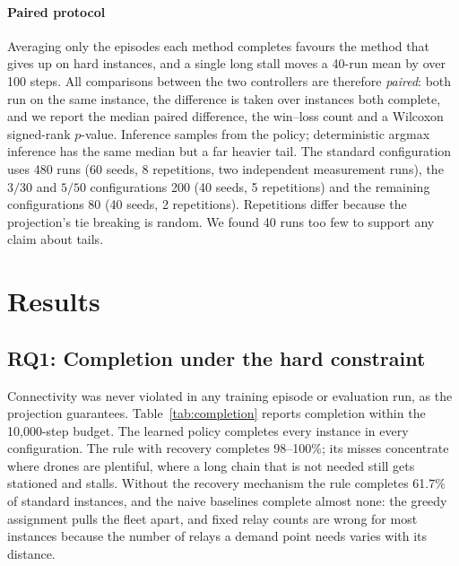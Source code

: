\documentclass[final,5p,times,twocolumn]{elsarticle}
\begin{document}
\paragraph{Paired protocol}
Averaging only the episodes each method completes favours the method that gives up on hard
instances, and a single long stall moves a 40-run mean by over 100 steps. All comparisons
between the two controllers are therefore \emph{paired}: both run on the same instance, the
difference is taken over instances both complete, and we report the median paired difference,
the win--loss count and a Wilcoxon signed-rank $p$-value. Inference samples from the policy;
deterministic argmax inference has the same median but a far heavier tail. The standard
configuration uses 480 runs (60 seeds, 8 repetitions, two independent measurement runs),
the $3/30$ and $5/50$ configurations 200 (40 seeds, 5 repetitions) and the remaining
configurations 80 (40 seeds, 2 repetitions). Repetitions differ because the projection's tie
breaking is random. We found 40 runs too few to support any claim about tails.

\section{Results}
\label{sec:results}

\subsection{RQ1: Completion under the hard constraint}
\label{sec:rq1}

Connectivity was never violated in any training episode or evaluation run, as the projection
guarantees. Table~\ref{tab:completion} reports completion within the 10{,}000-step budget. The
learned policy completes every instance in every configuration. The rule with recovery
completes 98--100\%; its misses concentrate where drones are plentiful, where a long chain that
is not needed still gets stationed and stalls. Without the recovery mechanism the rule completes
61.7\% of standard instances, and the naive baselines complete almost none: the greedy assignment
pulls the fleet apart, and fixed relay counts are wrong for most instances because the number of
relays a demand point needs varies with its distance.
\end{document}

